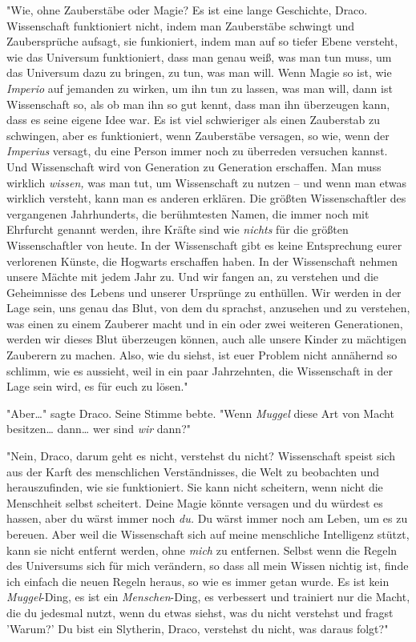 {"Wie, ohne Zauberstäbe oder Magie? Es ist eine lange Geschichte, Draco. Wissenschaft funktioniert nicht, indem man Zauberstäbe schwingt und Zaubersprüche aufsagt, sie funkioniert, indem man auf so tiefer Ebene versteht, wie das Universum funktioniert, dass man genau weiß, was man tun muss, um das Universum dazu zu bringen, zu tun, was man will. Wenn Magie so ist, wie \emph{Imperio} auf jemanden zu wirken, um ihn tun zu lassen, was man will, dann ist Wissenschaft so, als ob man ihn so gut kennt, dass man ihn überzeugen kann, dass es seine eigene Idee war. Es ist viel schwieriger als einen Zauberstab zu schwingen, aber es funktioniert, wenn Zauberstäbe versagen, so wie, wenn der \emph{Imperius} versagt, du eine Person immer noch zu überreden versuchen kannst. Und Wissenschaft wird von Generation zu Generation erschaffen. Man muss wirklich \emph{wissen,} was man tut, um Wissenschaft zu nutzen -- und wenn man etwas wirklich versteht, kann man es anderen erklären. Die größten Wissenschaftler des vergangenen Jahrhunderts, die berühmtesten Namen, die immer noch mit Ehrfurcht genannt werden, ihre Kräfte sind wie \emph{nichts} für die größten Wissenschaftler von heute. In der Wissenschaft gibt es keine Entsprechung eurer verlorenen Künste, die Hogwarts erschaffen haben. In der Wissenschaft nehmen unsere Mächte mit jedem Jahr zu. Und wir fangen an, zu verstehen und die Geheimnisse des Lebens und unserer Ursprünge zu enthüllen. Wir werden in der Lage sein, uns genau das Blut, von dem du sprachst, anzusehen und zu verstehen, was einen zu einem Zauberer macht und in ein oder zwei weiteren Generationen, werden wir dieses Blut überzeugen können, auch alle unsere Kinder zu mächtigen Zauberern zu machen. Also, wie du siehst, ist euer Problem nicht annähernd so schlimm, wie es aussieht, weil in ein paar Jahrzehnten, die Wissenschaft in der Lage sein wird, es für euch zu lösen."

"Aber…" sagte Draco. Seine Stimme bebte. "Wenn \emph{Muggel} diese Art von Macht besitzen… dann… wer sind \emph{wir} dann?"

"Nein, Draco, darum geht es nicht, verstehst du nicht? Wissenschaft speist sich aus der Karft des menschlichen Verständnisses, die Welt zu beobachten und herauszufinden, wie sie funktioniert. Sie kann nicht scheitern, wenn nicht die Menschheit selbst scheitert. Deine Magie könnte versagen und du würdest es hassen, aber du wärst immer noch \emph{du.} Du wärst immer noch am Leben, um es zu bereuen. Aber weil die Wissenschaft sich auf meine menschliche Intelligenz stützt, kann sie nicht entfernt werden, ohne \emph{mich} zu entfernen. Selbst wenn die Regeln des Universums sich für mich verändern, so dass all mein Wissen nichtig ist, finde ich einfach die neuen Regeln heraus, so wie es immer getan wurde. Es ist kein \emph{Muggel}-Ding, es ist ein \emph{Menschen}-Ding, es verbessert und trainiert nur die Macht, die du jedesmal nutzt, wenn du etwas siehst, was du nicht verstehst und fragst 'Warum?' Du bist ein Slytherin, Draco, verstehst du nicht, was daraus folgt?"

}
